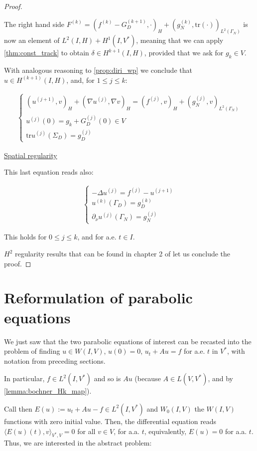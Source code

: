 \documentclass[english,a4paper,9pt,oneside]{scrbook}	%
\theoremstyle{break}
\newenvironment{mproof}[1][\proofname]{%
  \begin{proof}[#1]$ $\par\nobreak\ignorespaces
}{%
  \end{proof}
}
\renewcommand*{\proofname}{Proof}
\theoremstyle{remark}
\newcommand{\tr}{\text{tr}}
\begin{document}
\begin{appendices}
\begin{mproof}
The right hand side $F^{(k)} = (f^{(k)} - G^{(k+1)}_D, \cdot)_H +(g_N^{(k)}, \tr(\cdot))_{L^2(\Gamma_N)}$ is now an element of $L^2(I,H) + H^1(I,V^*)$, meaning that we can apply \cref{thm:const_track} to obtain $\delta \in H^{k+1}(I,H)$, provided that we ask for $g_k \in V$.

With analogous reasoning to \cref{prop:diri_wp} we conclude that $u \in H^{(k+1)}(I,H)$, and, for $1\leq j \leq k$:

\begin{align*}
	\left\{\begin{matrix}
(u^{(j+1)},v)_H + (\nabla u^{(j)}, \nabla v)_H = ( f^{(j)}, v)_H + (g_N^{(j)}, v)_{L^2(\Gamma_N)} \\
u^{(j)}(0) = g_k + G_D^{(j)}(0)  \in V \\
\tr u^{(j)}(\Sigma_D) = g_D^{(j)}
\end{matrix}\right.
\end{align*}

\underline{Spatial regularity}

This last equation reads also:

\begin{align*}
\left\{\begin{matrix}
- \Delta  u^{(j)} = f^{(j)} - u^{(j+1)} \\
u^{(k)}(\Gamma_D) = g_D^{(k)} \\
\partial_\nu u^{(j)}(\Gamma_N) = g_N^{(j)}
\end{matrix}\right.
\end{align*}

This holds for $0\leq j \leq k$, and for a.e. $t \in I$.

$H^2$ regularity results that can be found in chapter 2 of \cite{grisvard} let us conclude the proof.
\end{mproof}

\section{Reformulation of parabolic equations}

We just saw that the two parabolic equations of interest can be recasted into the problem of finding $u\in W(I,V)$, $u(0)=0$, $u_t+Au=f$ for a.e. $t$ in $V^*$, with notation from preceding sections.

In particular, $f \in L^2(I, V^*)$ and so is $Au$ (because $A\in L(V,V^*)$, and by \cref{lemma:bochner_Hk_map}).

Call then $E(u):=u_t+Au-f \in L^2(I,V^*)$ and $W_0(I,V)$ the $W(I,V)$ functions with zero initial value. Then, the differential equation reads $\langle E(u)(t),v\rangle_{V^*,V}=0$ for all $v\in V$, for a.a. $t$, equivalently, $E(u)=0$ for a.a. $t$. Thus, we are interested in the abstract problem:


\end{appendices}
\end{document}
